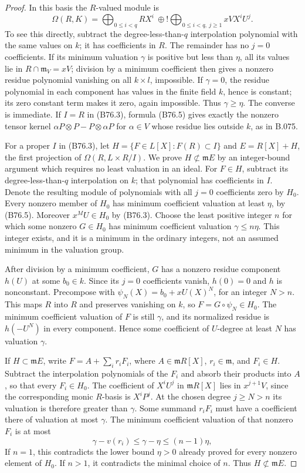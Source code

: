\begin{proof}
In this basis the $R$-valued module is
\[
 \Omega(R,K)=
 \bigoplus_{0\le i<q}RX^i
 \ \oplus\!!\bigoplus_{0\le i<q,\ j\ge1}xVX^iU^j.       \tag{B76.5}
\]
To see this directly, subtract the degree-less-than-$q$ interpolation
polynomial with the same values on $k$; it has coefficients in $R$.
The remainder has no $j=0$ coefficients. If its minimum valuation
$\gamma$ is positive but less than $\eta$, all its values lie in
$R\cap\mathfrak m_V=xV$; division by a minimum coefficient then gives
a nonzero residue polynomial vanishing on all $k\times l$, impossible.
If $\gamma=0$, the residue polynomial in each component has values
in the finite field $k$, hence is constant; its zero constant term
makes it zero, again impossible. Thus $\gamma\ge\eta$.
The converse is immediate. If $I=R$ in (B76.3), formula (B76.5) gives
exactly the nonzero tensor kernel $\alpha P\otimes P-P\otimes\alpha P$
for $\alpha\in V$ whose residue lies outside $k$, as in B.075.

For a proper $I$ in (B76.3), let
$H=\{F\in L[X]:F(R)\subset I\}$ and $E=R[X]+H$, the first projection of
$\Omega(R,L\times R/I)$. We prove $H\not\subset\mathfrak mE$ by an
integer-bound argument which requires no least valuation in an ideal.
For $F\in H$, subtract its degree-less-than-$q$ interpolation on $k$;
that polynomial has coefficients in $I$. Denote the resulting module
of polynomials with all $j=0$ coefficients zero by $H_0$.
Every nonzero member of $H_0$ has minimum coefficient valuation at
least $\eta$, by (B76.5). Moreover $x^MU\in H_0$ by (B76.3).
Choose the least positive integer $n$ for which some nonzero
$G\in H_0$ has minimum coefficient valuation $\gamma\le n\eta$.
This integer exists, and it is a minimum in the ordinary integers,
not an assumed minimum in the valuation group.

After division by a minimum coefficient, $G$ has a nonzero residue
component $h(U)$ at some $b_0\in k$. Since its $j=0$ coefficients
vanish, $h(0)=0$ and $h$ is nonconstant.
Precompose with $\psi_N(X)=b_0+xU(X)^N$, for an integer $N>n$.
This maps $R$ into $R$ and preserves vanishing on $k$, so
$F=G\circ\psi_N\in H_0$.
The minimum coefficient valuation of $F$ is still $\gamma$, and its
normalized residue is $h(-U^N)$ in every component. Hence some
coefficient of $U$-degree at least $N$ has valuation $\gamma$.

If $H\subset\mathfrak mE$, write
$F=A+\sum_i r_iF_i$, where $A\in\mathfrak mR[X]$,
$r_i\in\mathfrak m$, and $F_i\in H$.
Subtract the interpolation polynomials of the $F_i$ and absorb their
products into $A$, so that every $F_i\in H_0$.
The coefficient of $X^iU^j$ in $\mathfrak mR[X]$ lies in
$x^{j+1}V$, since the corresponding monic $R$-basis is $X^iP^j$.
At the chosen degree $j\ge N>n$ its valuation is therefore greater
than $\gamma$. Some summand $r_iF_i$ must have a coefficient there
of valuation at most $\gamma$. The minimum coefficient valuation
of that nonzero $F_i$ is at most
\[
                  \gamma-v(r_i)\le\gamma-\eta
                                     \le(n-1)\eta,
\]
If $n=1$, this contradicts the lower bound $\eta>0$ already proved
for every nonzero element of $H_0$. If $n>1$, it contradicts the
minimal choice of $n$. Thus $H\not\subset\mathfrak mE$.


\end{proof}
